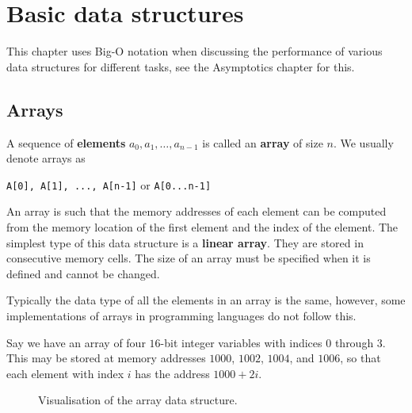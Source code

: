 \chapter{Basic data structures}

This chapter uses Big-O notation when discussing the performance of various data structures for different tasks, see the Asymptotics chapter for this.

\section{Arrays}

\begin{definition}
    A sequence of \textbf{elements} $a_0, a_1, \ldots, a_{n-1}$ is called an \textbf{array} of size $n$. We usually denote arrays as 
    \begin{center}
        \texttt{A[0], A[1], ..., A[n-1]} \quad or \quad \texttt{A[0...n-1]}
    \end{center}
    An array is such that the memory addresses of each element can be computed from the memory location of the first element and the index of the element. The simplest type of this data structure is a \textbf{linear array}. They are stored in consecutive memory cells. The size of an array must be specified when it is defined and cannot be changed.
\end{definition}

\begin{remark}
    Typically the data type of all the elements in an array is the same, however, some implementations of arrays in programming languages do not follow this.
\end{remark}

\begin{example}
    Say we have an array of four $16$-bit integer variables with indices $0$ through $3$. This may be stored at memory addresses $1000$, $1002$, $1004$, and $1006$, so that each element with index $i$ has the address $1000+2i$.
\end{example}

\begin{figure}
    \centering
    \label{fig:hello_string}
    \caption{Visualisation of the array data structure.}
\end{figure}

